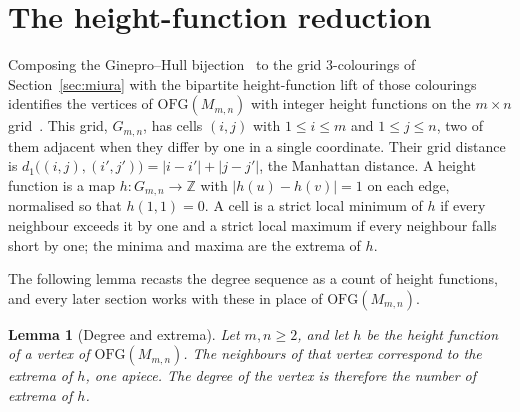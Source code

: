 \documentclass[11pt]{article}
\newtheorem{lemma}[theorem]{Lemma}
\theoremstyle{definition}
\theoremstyle{remark}
\newcommand{\OFG}{\mathrm{OFG}}
\newcommand{\dgrid}{d_1}
\newcommand{\Z}{\mathbb{Z}}
\newcommand{\Mm}{M_{m,n}}
\newcommand{\Gmn}{G_{m,n}}
\begin{document}
\section{The height-function reduction}\label{sec:background}

Composing the Ginepro--Hull bijection~\cite{GineproHull2014counting} to the
grid $3$-colourings of Section~\ref{sec:miura} with the bipartite
height-function lift of those colourings~\cite{Cereceda2009mixing} identifies
the vertices of $\OFG(\Mm)$ with integer height functions on the $m\times n$
grid~\cite{Gupta2026companion}. This grid, $\Gmn$, has cells $(i,j)$ with
$1\le i\le m$ and $1\le j\le n$, two of them adjacent when they differ by one in
a single coordinate. Their grid distance is
$\dgrid\big((i,j),(i',j')\big)=|i-i'|+|j-j'|$, the Manhattan distance. A
height function is a map $h\colon\Gmn\to\Z$ with $|h(u)-h(v)|=1$ on each
edge, normalised so that $h(1,1)=0$. A cell is a strict local minimum of
$h$ if every neighbour exceeds it by one and a strict local maximum if
every neighbour falls short by one; the minima and maxima are the extrema
of $h$.

The following lemma recasts the degree sequence as a count of height
functions, and every later section works with these in place of $\OFG(\Mm)$.

\begin{lemma}[Degree and extrema]\label{lem:degextrema}
Let $m,n\ge2$, and let $h$ be the height function of a vertex of $\OFG(\Mm)$. The
neighbours of that vertex correspond to the extrema of $h$, one apiece. The
degree of the vertex is therefore the number of extrema of $h$.
\end{lemma}
\end{document}
